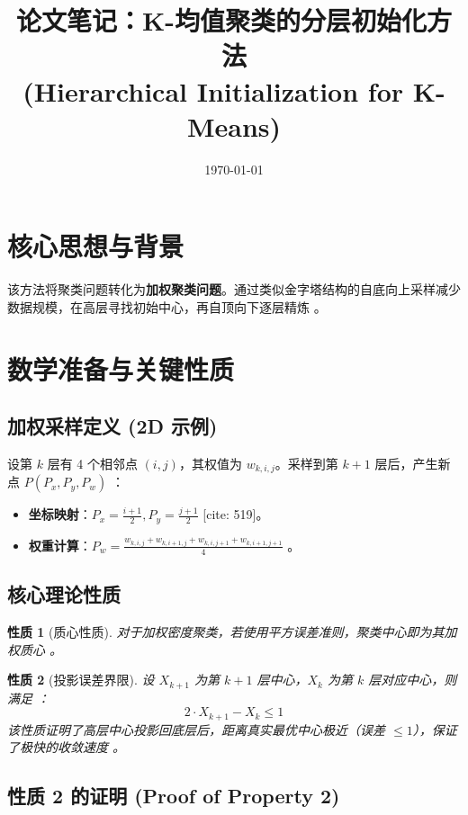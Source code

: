 \documentclass[11pt,a4paper]{article}
\title{论文笔记：K-均值聚类的分层初始化方法 \\ (Hierarchical Initialization for K-Means)}
\date{\today}
\newtheorem{property}{性质}
\begin{document}
\maketitle

\section{核心思想与背景}
该方法将聚类问题转化为\textbf{加权聚类问题}。通过类似金字塔结构的自底向上采样减少数据规模，在高层寻找初始中心，再自顶向下逐层精炼 。

\section{数学准备与关键性质}

\subsection{加权采样定义 (2D 示例)}
设第 $k$ 层有 4 个相邻点 $(i,j)$，其权值为 $w_{k,i,j}$。采样到第 $k+1$ 层后，产生新点 $P(P_x, P_y, P_w)$ ：
\begin{itemize}
    \item \textbf{坐标映射}：$P_x = \frac{i+1}{2}, P_y = \frac{j+1}{2}$ [cite: 519]。
    \item \textbf{权重计算}：$P_w = \frac{w_{k,i,j} + w_{k,i+1,j} + w_{k,i,j+1} + w_{k,i+1,j+1}}{4}$ 。
\end{itemize}

\subsection{核心理论性质}
\begin{property}[质心性质]
对于加权密度聚类，若使用平方误差准则，聚类中心即为其加权质心 。
\end{property}

\begin{property}[投影误差界限]
设 $X_{k+1}$ 为第 $k+1$ 层中心，$X_k$ 为第 $k$ 层对应中心，则满足 ：
\begin{equation}
    2 \cdot X_{k+1} - X_k \le 1
\end{equation}
该性质证明了高层中心投影回底层后，距离真实最优中心极近（误差 $\le 1$），保证了极快的收敛速度 。
\end{property}

\subsection{性质 2 的证明 (Proof of Property 2)}
\end{document}
